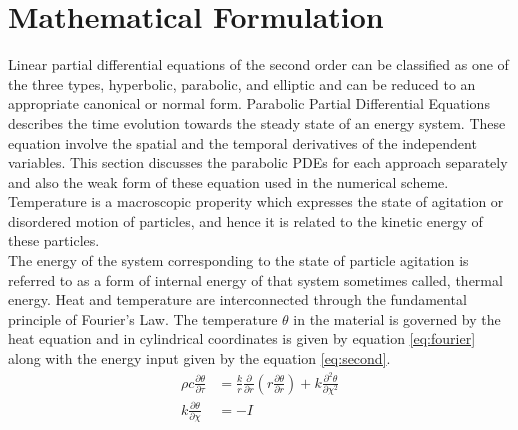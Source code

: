 \chapter{Mathematical Formulation\label{cha:chapter2}}

Linear partial differential equations of the second order can be classified as one of the three types, hyperbolic, parabolic, and elliptic and can be reduced to an appropriate canonical or normal form\cite{debnath2010nonlinear}. Parabolic Partial Differential Equations describes the time evolution towards the steady state of an energy system. These equation involve the spatial and the temporal derivatives of the independent variables. This section discusses the parabolic PDEs for each approach separately and also the weak form of these equation used in the numerical scheme.\\ 
Temperature is a macroscopic properity which expresses the state of agitation or disordered motion of particles, and hence it is related to the kinetic energy of these particles. \\ 
The energy of the system corresponding to the state  of particle agitation is referred to as a form of internal energy of that  system sometimes called, thermal energy\cite{erickson1985heat}. Heat and temperature are interconnected through the fundamental principle of Fourier's Law. The temperature $\theta$ in the material is governed by the heat equation and in cylindrical coordinates is given by equation \ref{eq:fourier} along with the energy input given by the equation \ref{eq:second}.
\begin{subequations}
\begin{align}
\rho c \frac{\partial \theta}{\partial \tau} &= \frac{k}{r} \frac{\partial}{\partial r} \left( r \frac{\partial \theta}{\partial r} \right) + k \frac{\partial^2 \theta}{\partial \chi^2} \label{eq:fourier} \\
k \frac{\partial \theta}{\partial \chi} &= -I \label{eq:second}
\end{align}
\end{subequations}

